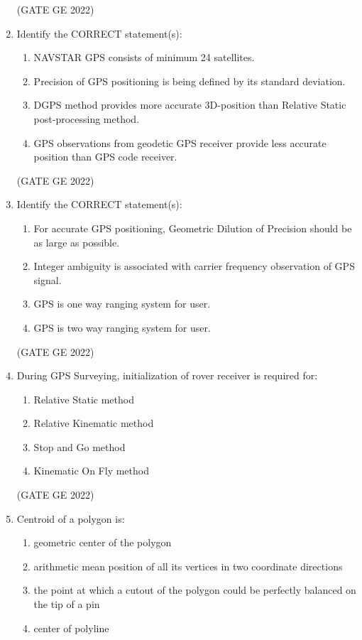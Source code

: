 \documentclass[a4paper, 11pt]{article}
\begin{document}
\begin{enumerate}
\hfill (GATE GE 2022)

\item Identify the CORRECT statement(s):
\begin{enumerate}
    \item NAVSTAR GPS consists of minimum 24 satellites.
    \item Precision of GPS positioning is being defined by its standard deviation.
    \item DGPS method provides more accurate 3D-position than Relative Static post-processing method.
    \item GPS observations from geodetic GPS receiver provide less accurate position than GPS code receiver.
\end{enumerate}

\hfill (GATE GE 2022)

\item Identify the CORRECT statement(s):
\begin{enumerate}
    \item For accurate GPS positioning, Geometric Dilution of Precision should be as large as possible.
    \item Integer ambiguity is associated with carrier frequency observation of GPS signal.
    \item GPS is one way ranging system for user.
    \item GPS is two way ranging system for user.
\end{enumerate}

\hfill (GATE GE 2022)

\item During GPS Surveying, initialization of rover receiver is required for:
\begin{enumerate}
    \item Relative Static method
    \item Relative Kinematic method
    \item Stop and Go method
    \item Kinematic On Fly method
\end{enumerate}

\hfill (GATE GE 2022)

\item Centroid of a polygon is:
\begin{enumerate}
    \item geometric center of the polygon
    \item arithmetic mean position of all its vertices in two coordinate directions
    \item the point at which a cutout of the polygon could be perfectly balanced on the tip of a pin
    \item center of polyline
\end{enumerate}


\end{enumerate}
\end{document}
